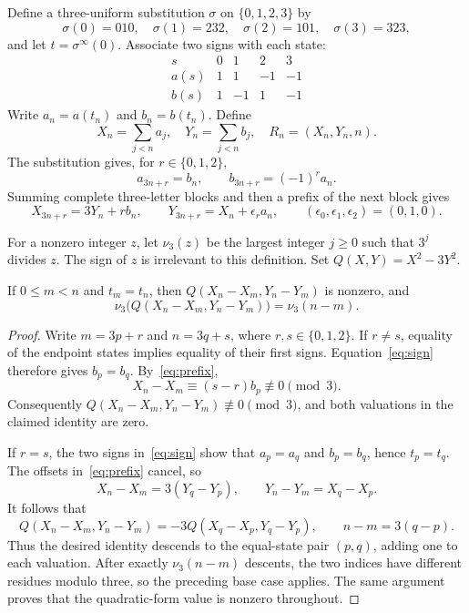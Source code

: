 \documentclass[12pt,reqno]{article}
\newcommand{\vp}{\nu_3}
\begin{document}
Define a three-uniform substitution $\sigma$ on $\{0,1,2,3\}$ by
\[
 \sigma(0)=010,\quad \sigma(1)=232,\quad
 \sigma(2)=101,\quad \sigma(3)=323,
\]
and let $t=\sigma^\infty(0)$. Associate two signs with each state:
\[
\begin{array}{c|rrrr}
 s&0&1&2&3\\\hline
 a(s)&1&1&-1&-1\\
 b(s)&1&-1&1&-1
\end{array}
\]
Write $a_n=a(t_n)$ and $b_n=b(t_n)$. Define
\[
 X_n=\sum_{j<n}a_j,\quad Y_n=\sum_{j<n}b_j,\quad
 R_n=(X_n,Y_n,n).
\]
The substitution gives, for $r\in\{0,1,2\}$,
\begin{equation}\label{eq:sign}
 a_{3n+r}=b_n,\qquad b_{3n+r}=(-1)^r a_n.
\end{equation}
Summing complete three-letter blocks and then a prefix of the next
block gives
\begin{equation}\label{eq:prefix}
 X_{3n+r}=3Y_n+r b_n,\qquad
 Y_{3n+r}=X_n+\epsilon_r a_n,
 \qquad(\epsilon_0,\epsilon_1,\epsilon_2)=(0,1,0).
\end{equation}

For a nonzero integer $z$, let $\vp(z)$ be the largest integer $j\geq0$
such that $3^j$ divides $z$. The sign of $z$ is irrelevant to this
definition. Set $Q(X,Y)=X^2-3Y^2$.

\begin{lemma}\label{lem:valuation2}
If $0\leq m<n$ and $t_m=t_n$, then $Q(X_n-X_m,Y_n-Y_m)$ is nonzero,
and
\[
 \vp\bigl(Q(X_n-X_m,Y_n-Y_m)\bigr)=\vp(n-m).
\]
\end{lemma}
\begin{proof}
Write $m=3p+r$ and $n=3q+s$, where $r,s\in\{0,1,2\}$.
If $r\ne s$, equality of the endpoint states implies equality of their
first signs. Equation~\eqref{eq:sign} therefore gives $b_p=b_q$.
By~\eqref{eq:prefix},
\[
 X_n-X_m\equiv (s-r)b_p\not\equiv0\pmod3.
\]
Consequently $Q(X_n-X_m,Y_n-Y_m)\not\equiv0\pmod3$, and both
valuations in the claimed identity are zero.

If $r=s$, the two signs in~\eqref{eq:sign} show that $a_p=a_q$ and
$b_p=b_q$, hence $t_p=t_q$. The offsets in~\eqref{eq:prefix} cancel,
so
\[
 X_n-X_m=3(Y_q-Y_p),\qquad Y_n-Y_m=X_q-X_p.
\]
It follows that
\[
 Q(X_n-X_m,Y_n-Y_m)
 =-3Q(X_q-X_p,Y_q-Y_p),\qquad n-m=3(q-p).
\]
Thus the desired identity descends to the equal-state pair $(p,q)$,
adding one to each valuation. After exactly $\vp(n-m)$ descents, the
two indices have different residues modulo three, so the preceding
base case applies. The same argument proves that the quadratic-form
value is nonzero throughout.
\end{proof}
\end{document}
